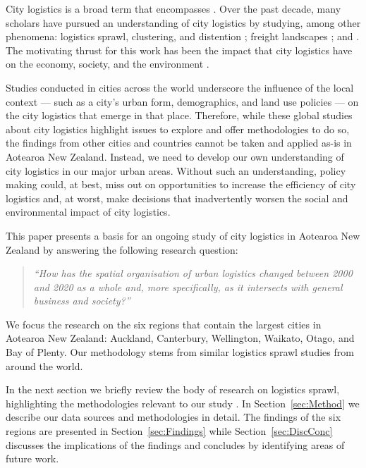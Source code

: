 \documentclass[3p, a4paper, authoryear, 11pt, fleqn, review]{elsarticle}
\newcommand{\nmt}[1]{{\color{ForestGreen}{~(nmt: #1)}}}
\begin{document}
\nmt{This needs more careful thought} City logistics is a broad term that encompasses \nmt{...}. Over the past decade, many scholars have pursued an understanding of city logistics by studying, among other phenomena: logistics sprawl, clustering\nmt{?}, and distention \nmt{refs}; freight landscapes \nmt{extend phrase and add}; and \nmt{holguin veras work...  and other elements of city logistics}. The motivating thrust for this work has been the impact that city logistics have on the economy, society, and the environment \nmt{Aljohani Thompson and others.}.

\nmt{Expand on impact and why it's important}

\nmt{Concern} Studies conducted in cities across the world underscore the influence of the local context --- such as a city's urban form, demographics, and land use policies --- on the city logistics that emerge in that place. Therefore, while these global studies about city logistics highlight issues to explore and offer methodologies to do so, the findings from other cities and countries cannot be taken and applied as-is in Aotearoa New Zealand. \nmt{Course of action} Instead, we need to develop our own understanding of city logistics in our major urban areas. Without such an understanding, policy making could, at best, miss out on opportunities to increase the efficiency of city logistics and, at worst, make decisions that inadvertently worsen the social and environmental impact of city logistics. 


\nmt{Contribution} This paper presents a basis for an ongoing study of city logistics in Aotearoa New Zealand by answering the following research question:
\begin{quote}
\emph{``How has the spatial organisation of urban logistics changed between 2000 and 2020 as a whole and, more specifically, as it intersects with general business and society?''}  	
\end{quote}

We focus the research on the six regions that contain the largest cities in Aotearoa New Zealand: Auckland, Canterbury, Wellington, Waikato, Otago, and Bay of Plenty. Our methodology stems from similar logistics sprawl studies from around the world. 

In the next section we briefly review the body of research on logistics sprawl, highlighting the methodologies relevant to our study \nmt{revise}. In Section~\ref{sec:Method} we describe our data sources and methodologies in detail. The findings of the six regions are presented in Section~\ref{sec:Findings} while Section~\ref{sec:DiscConc} discusses the implications of the findings and concludes by identifying areas of future work. 
\end{document}
